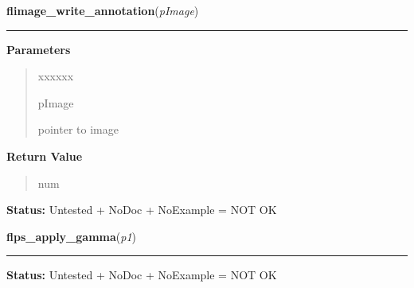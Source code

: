 \hspace{.8\funcindent}\begin{boxedminipage}{\funcwidth}

    \raggedright \textbf{flimage\_write\_annotation}(\textit{pImage})

    \vspace{-1.5ex}

    \rule{\textwidth}{0.5\fboxrule}
\setlength{\parskip}{2ex}
\setlength{\parskip}{1ex}
      \textbf{Parameters}
      \vspace{-1ex}

      \begin{quote}
        \begin{Ventry}{xxxxxx}

          \item[pImage]

          pointer to image

        \end{Ventry}

      \end{quote}

      \textbf{Return Value}
    \vspace{-1ex}

      \begin{quote}
      num

      \end{quote}

\textbf{Status:} Untested + NoDoc + NoExample = NOT OK



    \end{boxedminipage}

    \label{xformslib:library:flps_apply_gamma}

    \vspace{0.5ex}

\hspace{.8\funcindent}\begin{boxedminipage}{\funcwidth}

    \raggedright \textbf{flps\_apply\_gamma}(\textit{p1})

    \vspace{-1.5ex}

    \rule{\textwidth}{0.5\fboxrule}
\setlength{\parskip}{2ex}
\setlength{\parskip}{1ex}
\textbf{Status:} Untested + NoDoc + NoExample = NOT OK



    \end{boxedminipage}

